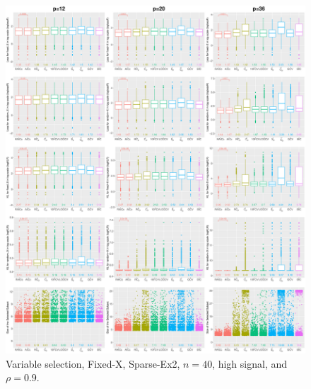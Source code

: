 \begin{figure}[!ht]
\centering
\includegraphics[width=\textwidth]{figures/supplement/fixedx/subset_selection/Sparse-Ex2_n40_hsnr_rho09.eps}
\caption{Variable selection, Fixed-X, Sparse-Ex2, $n=40$, high signal, and $\rho=0.9$.}
\end{figure}
\clearpage
